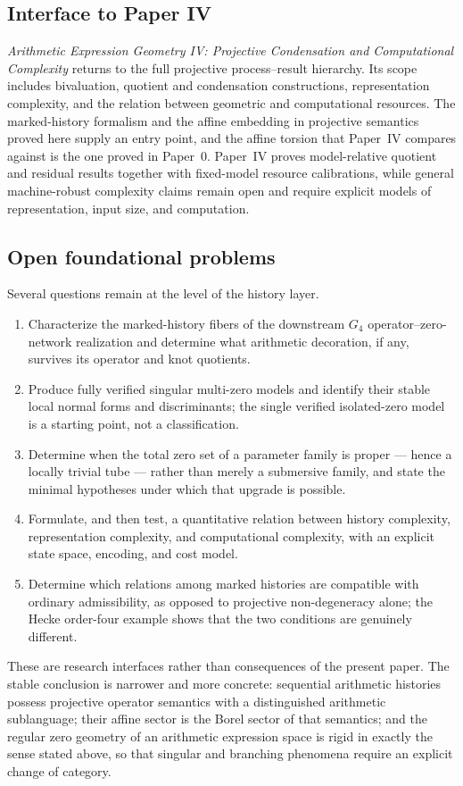 \subsection{Interface to Paper IV}

\emph{Arithmetic Expression Geometry IV: Projective Condensation and
Computational Complexity} returns to the full projective process--result
hierarchy.  Its scope includes bivaluation, quotient and condensation
constructions, representation complexity, and the relation between geometric and
computational resources.  The marked-history formalism and the affine embedding
in projective semantics proved here supply an entry point, and the affine
torsion that Paper~IV compares against is the one proved in Paper~0.  Paper~IV
proves model-relative quotient and residual results together with fixed-model
resource calibrations, while general machine-robust complexity claims remain
open and require explicit models of representation, input size, and computation.

\subsection{Open foundational problems}

Several questions remain at the level of the history layer.
\begin{enumerate}
    \item Characterize the marked-history fibers of the downstream $G_4$
    operator--zero-network realization and determine what arithmetic decoration,
    if any, survives its operator and knot quotients.
    \item Produce fully verified singular multi-zero models and identify their
    stable local normal forms and discriminants; the single verified
    isolated-zero model is a starting point, not a classification.
    \item Determine when the total zero set of a parameter family is proper ---
    hence a locally trivial tube --- rather than merely a submersive family, and
    state the minimal hypotheses under which that upgrade is possible.
    \item Formulate, and then test, a quantitative relation between history
    complexity, representation complexity, and computational complexity, with an
    explicit state space, encoding, and cost model.
    \item Determine which relations among marked histories are compatible with
    ordinary admissibility, as opposed to projective non-degeneracy alone; the
    Hecke order-four example shows that the two conditions are genuinely
    different.
\end{enumerate}

These are research interfaces rather than consequences of the present paper.
The stable conclusion is narrower and more concrete: sequential arithmetic
histories possess projective operator semantics with a distinguished arithmetic
sublanguage; their affine sector is the Borel sector of that semantics; and the
regular zero geometry of an arithmetic expression space is rigid in exactly the
sense stated above, so that singular and branching phenomena require an explicit
change of category.
